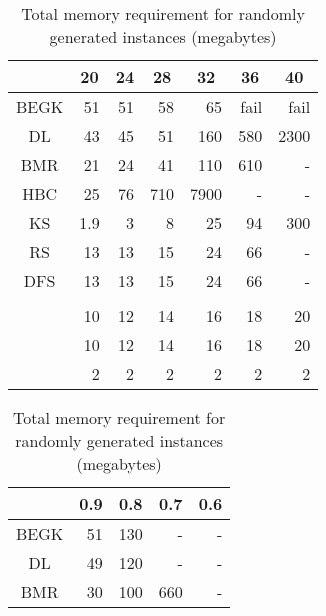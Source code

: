 \begin{table}
\begin{minipage}[t]{165pt}
\caption{Total memory requirement for dual matching graphs (megabytes)}
\label{memdm}
\begin{center}
\begin{tabular}[c]{| r | r | r | r | r | r | r |}
\hline
\multicolumn{1}{|c||}{} & \multicolumn{1}{|c|}{20} & \multicolumn{1}{|c|}{24} & \multicolumn{1}{|c|}{28} & \multicolumn{1}{|c|}{32} & \multicolumn{1}{|c|}{36} & \multicolumn{1}{|c|}{40} \\\hline
\multicolumn{1}{|c||}{BEGK} & 51 & 51 & 58 & 65 & fail & fail\\\hline
\multicolumn{1}{|c||}{DL} & 43 & 45 & 51 & 160 & 580 & 2300\\\hline
\multicolumn{1}{|c||}{BMR} & 21 & 24 & 41 & 110 & 610 & -\\\hline
\multicolumn{1}{|c||}{HBC} & 25 & 76 & 710 & 7900 & - & -\\\hline
\multicolumn{1}{|c||}{KS} & 1.9 & 3 & 8 & 25 & 94 & 300\\\hline
\multicolumn{1}{|c||}{RS} & 13 & 13 & 15 & 24 & 66 & -\\\hline
\multicolumn{1}{|c||}{DFS} & 13 & 13 & 15 & 24 & 66 & -\\\hline
\hline
\multicolumn{1}{|c||}{} &&&&&&\\\hline
\multicolumn{1}{|c||}{} & 10 & 12 & 14 & 16 & 18 & 20\\\hline
\multicolumn{1}{|c||}{} & 10 & 12 & 14 & 16 & 18 & 20\\\hline
\multicolumn{1}{|c||}{} & 2 & 2 & 2 & 2 & 2 & 2\\\hline
\end{tabular}
\end{center}
\end{minipage}
\begin{minipage}[t]{178pt}
\caption{Total memory requirement for randomly generated instances (megabytes)}
\label{memp}
\begin{center}
\begin{tabular}[c]{| r | r | r | r | r |}
\hline
\multicolumn{1}{|c||}{} & \multicolumn{1}{|c|}{0.9} & \multicolumn{1}{|c|}{0.8} & \multicolumn{1}{|c|}{0.7} & \multicolumn{1}{|c|}{0.6} \\\hline
\multicolumn{1}{|c||}{BEGK} & 51 & 130 & - & -\\\hline
\multicolumn{1}{|c||}{DL} & 49 & 120 & - & -\\\hline
\multicolumn{1}{|c||}{BMR} & 30 & 100 & 660 & -\\\hline

\end{tabular}
\end{center}
\end{minipage}
\end{table}
